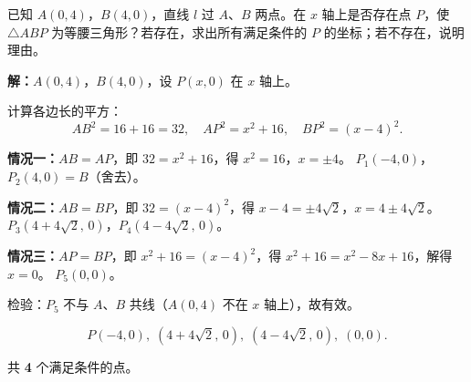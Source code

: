 \documentclass[12pt, a4paper]{ctexart}
\begin{document}
\begin{examplebox}[【例5】一次函数与等腰三角形存在性]
已知 $A(0,4)$，$B(4,0)$，直线 $l$ 过 $A$、$B$ 两点。在 $x$ 轴上是否存在点 $P$，使 $\triangle ABP$ 为等腰三角形？若存在，求出所有满足条件的 $P$ 的坐标；若不存在，说明理由。

\begin{center}
\end{center}

\textbf{解：}$A(0,4)$，$B(4,0)$，设 $P(x,0)$ 在 $x$ 轴上。

计算各边长的平方：
\[AB^2=16+16=32,\quad AP^2=x^2+16,\quad BP^2=(x-4)^2.\]

\textbf{情况一：}$AB=AP$，即 $32=x^2+16$，得 $x^2=16$，$x=\pm 4$。
$P_1(-4,0)$，$P_2(4,0)=B$（舍去）。

\textbf{情况二：}$AB=BP$，即 $32=(x-4)^2$，得 $x-4=\pm 4\sqrt{2}$，$x=4\pm 4\sqrt{2}$。
$P_3(4+4\sqrt{2},\,0)$，$P_4(4-4\sqrt{2},\,0)$。

\textbf{情况三：}$AP=BP$，即 $x^2+16=(x-4)^2$，得 $x^2+16=x^2-8x+16$，解得 $x=0$。
$P_5(0,0)$。

检验：$P_5$ 不与 $A$、$B$ 共线（$A(0,4)$ 不在 $x$ 轴上），故有效。

\[\boxed{P(-4,0),\;(4+4\sqrt{2},\,0),\;(4-4\sqrt{2},\,0),\;(0,0).}\]

共 \textbf{4} 个满足条件的点。
\end{examplebox}
\end{document}
